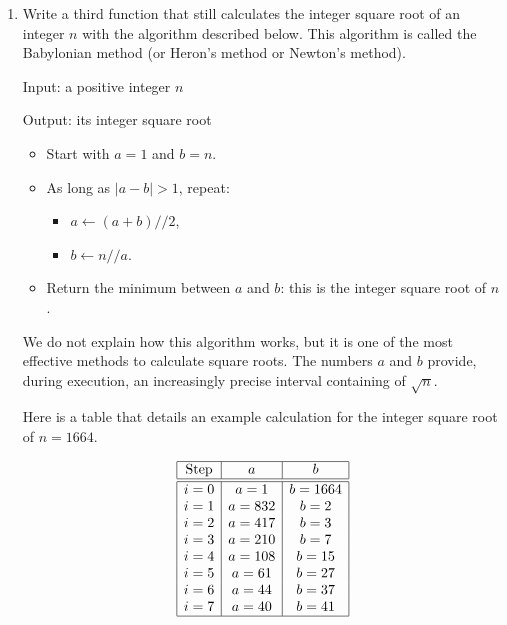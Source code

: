 \documentclass[11pt,class=report,crop=false]{standalone}
\begin{document}
\begin{activite}
\begin{enumerate}
  \item Write a third function that still calculates the integer square root of an integer $n$ with the algorithm described below. This algorithm is called the Babylonian method (or Heron's method or Newton's method).
  
    \begin{algorithme}
  Input: a positive integer $n$

  Output: its integer square root

  \begin{itemize}
    \item Start with $a=1$ and $b=n$.
    
    \item As long as $|a-b| > 1$, repeat:
    \begin{itemize} 
     \item $a \leftarrow (a+b)//2$,
     \item $b \leftarrow n // a$. 
    \end{itemize}          
         
    \item Return the minimum between $a$ and $b$: this is the integer square root of $n$.
  \end{itemize} 
           
 \end{algorithme}
 
 
  We do not explain how this algorithm works, but it is one of the most effective methods to calculate square roots. The numbers $a$ and $b$ provide, during execution, an increasingly precise interval containing of $\sqrt{n}$. 
  
  Here is a table that details an example calculation for the integer square root of $n=1664$.

  \medskip
  
$$\begin{array}{|c|c|c|} 
\hline
\text{Step} & a & b \\ \hline\hline
i = 0  &  a =  1    &  b =  1664 \\
i = 1  &  a =  832  &  b =  2 \\
i = 2  &  a =  417  &  b =  3 \\
i = 3  &  a =  210  &  b =  7 \\
i = 4  &  a =  108  &  b =  15 \\
i = 5  &  a =  61   &  b =  27 \\
i = 6  &  a =  44   &  b =  37 \\
i = 7  &  a =  40   &  b =  41 \\ \hline
\end{array}$$


\end{enumerate}
\end{activite}
\end{document}
